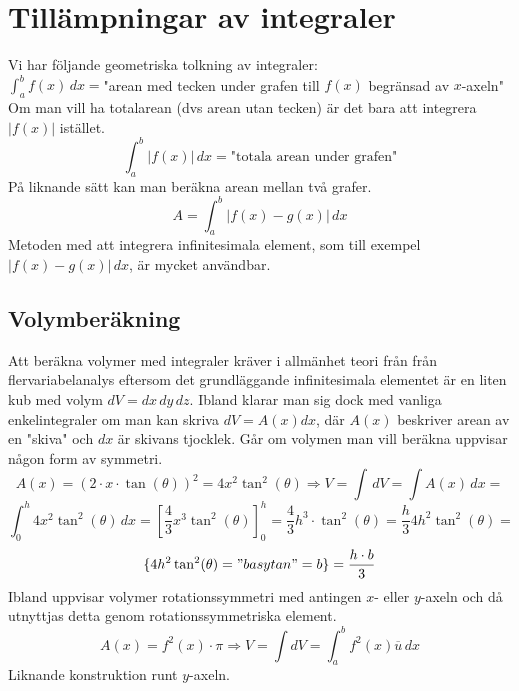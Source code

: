 \chapter{Tillämpningar av integraler}
Vi har följande geometriska tolkning av integraler:\\
$\int_a^bf(x)\, dx=$"arean med tecken under grafen till $f(x)$ begränsad av $x$-axeln"\\
Om man vill ha totalarean (dvs arean utan tecken) är det bara att integrera $|f(x)|$ istället.
\begin{equation*}
    \int_a^b|f(x)|\, dx=\text{"totala arean under grafen"}
\end{equation*}
På liknande sätt kan man beräkna arean mellan två grafer.
\begin{equation*}
    A=\int_a^b|f(x)-g(x)|\, dx
\end{equation*}
Metoden med att integrera infinitesimala element, som till exempel $|f(x)-g(x)|\,dx$, är mycket användbar.

\section{Volymberäkning}
Att beräkna volymer med integraler kräver i allmänhet teori från från flervariabelanalys eftersom det grundläggande infinitesimala elementet är en liten kub med volym $dV=dx\,dy\,dz$.
Ibland klarar man sig dock med vanliga enkelintegraler om man kan skriva $dV=A(x)dx$, där $A(x)$ beskriver arean av en "skiva" och $dx$ är skivans tjocklek.
Går om volymen man vill beräkna uppvisar någon form av symmetri.
\begin{equation*}
    A(x)=(2\cdot x\cdot\tan(\theta))^2=4x^2\tan^2(\theta)\Rightarrow
    V=\int\, dV=
    \int A(x)\, dx=
\end{equation*}
\begin{equation*}
    \int_0^h 4x^2\tan^2(\theta)\, dx=
        [\frac{4}{3}x^3\tan^2(\theta)]_0^h=
    \frac{4}{3}h^3\cdot\tan^2(\theta)=
    \frac{h}{3}4h^2\tan^2(\theta)=
\end{equation*}
\begin{equation*}
    \{4h^2\tan^2(\theta)="basytan"=b\}=
    \frac{h\cdot b}{3}
\end{equation*}
Ibland uppvisar volymer rotationssymmetri med antingen $x$- eller $y$-axeln och då utnyttjas detta genom rotationssymmetriska element.
\begin{equation*}
    A(x)=f^2(x)\cdot\pi\Rightarrow
    V=\int dV=\int_a^bf^2(x)\overline{u}\, dx
\end{equation*}
Liknande konstruktion runt $y$-axeln.

